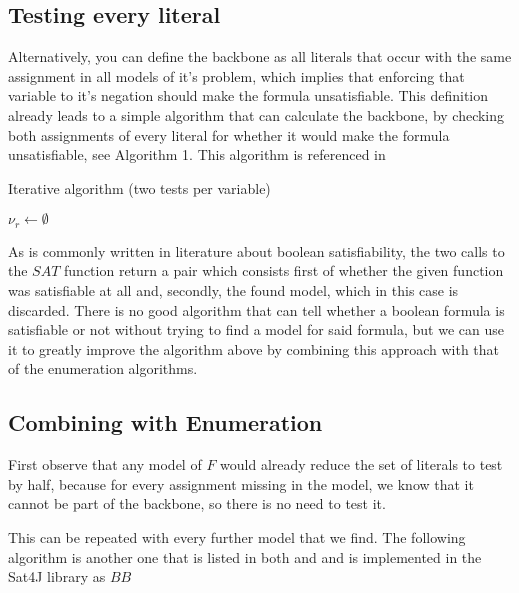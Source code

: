 \subsection{Testing every literal}
Alternatively, you can define the backbone as all literals that occur with the same assignment in all models of it's problem, which implies that enforcing that variable to it's negation should make the formula unsatisfiable. This definition already leads to a simple algorithm that can calculate the backbone, by checking both assignments of every literal for whether it would make the formula unsatisfiable, see Algorithm 1. This algorithm is referenced in \cite{mjl10}
\begin{algorithm}
\caption{{\sc Iterative algorithm (two tests per variable)}}
\DontPrintSemicolon
{}
$\nu_r \gets \emptyset$\;
\;
\end{algorithm}

As is commonly written in literature about boolean satisfiability, the two calls to the $SAT$ function return a pair which consists first of whether the given function was satisfiable at all and, secondly, the found model, which in this case is discarded. There is no good algorithm that can tell whether a boolean formula is satisfiable or not without trying to find a model for said formula, but we can use it to greatly improve the algorithm above by combining this approach with that of the enumeration algorithms.

\subsection{Combining with Enumeration}
First observe that any model of $F$ would already reduce the set of literals to test by half, because for every assignment missing in the model, we know that it cannot be part of the backbone, so there is no need to test it. 

This can be repeated with every further model that we find. The following algorithm is another one that is listed in both \cite{mjl10} and \cite{mjl15} and is implemented in the Sat4J library as $BB$

